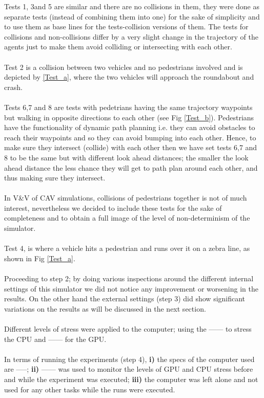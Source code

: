 \noindent Tests 1, 3and 5 are similar and there are no collisions in them, they were done as separate tests (instead of combining them into one) for the sake of simplicity and to use them as base lines for the tests-collision versions of them. The tests for collisions and non-collisions differ by a very slight change in the trajectory of the agents just to make them avoid colliding or intersecting with each other. \\\\ 
Test 2 is a collision between two vehicles and no pedestrians involved and is depicted by \ref{Test_a}, where the two vehicles will approach the roundabout and crash.\\\\
Tests 6,7 and 8 are tests with pedetrians having the same trajectory waypoints but walking in opposite directions to each other (see Fig \ref{Test_b}). 
Pedestrians have the functionality of dynamic path planning i.e. they can avoid obstacles to reach their waypoints and so they can avoid bumping into each other. 
Hence, to make sure they intersect (collide) with each other then we  have set tests 6,7 and 8 to be the same but with different look ahead distances; the smaller the look ahead distance the less chance they will get to path plan around each other, and thus making sure they intersect.\\\\ 
In V\&V of CAV simulations, collisions of pedestrians together is not of much interest, nevertheless we decided to include these tests for the sake of completeness and to obtain a full image of the level of non-determinism of the simulator.\\\\
Test 4, is where a vehicle hits a pedestrian and runs over it on a zebra line, as shown in Fig \ref{Test_a}.\\\\
Proceeding to step 2; by doing various inspections around the different internal settings of this simulator we did not notice any improvement or worsening in the results. 
On the other hand the external settings (step 3) did show significant variations on the results as will be discussed in the next section. \\\\
Different levels of stress were applied to the computer; using the ------ to stress the CPU and ------ for the GPU.\\\\ 
In terms of running the experiments (step 4), \textbf{i)} the specs of the computer used are -----; \textbf{ii)} ------ was used to monitor the levels of GPU and CPU stress before and while the experiment was executed; \textbf{iii)} the computer was left alone and not used for any other tasks while the runs were executed.

